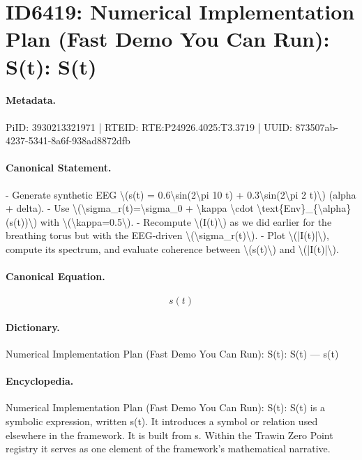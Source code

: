 \section*{ID6419: Numerical Implementation Plan (Fast Demo You Can Run): S(t): S(t)}
\paragraph{Metadata.}
PiID: 3930213321971 | RTEID: RTE:P24926.4025:T3.3719 | UUID: 873507ab-4237-5341-8a6f-938ad8872dfb

\paragraph{Canonical Statement.}
- Generate synthetic EEG \textbackslash{}(s(t) = 0.6\textbackslash{}sin(2\textbackslash{}pi 10 t) + 0.3\textbackslash{}sin(2\textbackslash{}pi 2 t)\textbackslash{}) (alpha + delta). - Use \textbackslash{}(\textbackslash{}sigma\_r(t)=\textbackslash{}sigma\_0 + \textbackslash{}kappa \textbackslash{}cdot \textbackslash{}text\{Env\}\_\{\textbackslash{}alpha\}(s(t))\textbackslash{}) with \textbackslash{}(\textbackslash{}kappa=0.5\textbackslash{}). - Recompute \textbackslash{}(I(t)\textbackslash{}) as we did earlier for the breathing torus but with the EEG-driven \textbackslash{}(\textbackslash{}sigma\_r(t)\textbackslash{}). - Plot \textbackslash{}(|I(t)|\textbackslash{}), compute its spectrum, and evaluate coherence between \textbackslash{}(s(t)\textbackslash{}) and \textbackslash{}(|I(t)|\textbackslash{}).

\paragraph{Canonical Equation.}
\[
s(t)
\]

\paragraph{Dictionary.}
Numerical Implementation Plan (Fast Demo You Can Run): S(t): S(t) — s(t)

\paragraph{Encyclopedia.}
Numerical Implementation Plan (Fast Demo You Can Run): S(t): S(t) is a symbolic expression, written s(t). It introduces a symbol or relation used elsewhere in the framework. It is built from s. Within the Trawin Zero Point registry it serves as one element of the framework's mathematical narrative.
